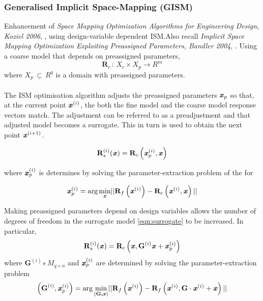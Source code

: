 

\subsubsection*{Generalised Implicit Space-Mapping (GISM)}
Enhancement of \textit{Space Mapping Optimization Algorithms for Engineering Design,
Koziel 2006}, \cite{SMOptAlgEngDesignKoziel}, using design-variable dependent ISM.Also recall \textit{Implicit Space Mapping Optimization Exploiting Preassigned Parameters, Bandler 2004}, \cite{ImplicitSMExploitParametersBandler}.
Using a coarse model that depends on preassigned parameters,
$$
\textbf{R}_c \, : \, X_c \times X_p \rightarrow R^m
$$
where $X_p \,\underline{\subset} \, R^q$ is a domain with preassigned parameters. \\
\\
The ISM optimisation algorithm adjusts the preassigned parameters $\textbf{\textit{x}}_p$ so that, at the current point $\textbf{\textit{x}}^{(i)}$, the both the fine model and the coarse model response vectors match. The adjustment can be referred to as a preadjustment  and that adjusted model becomes a surrogate. This in turn is used to obtain the next point $\textbf{\textit{x}}^{(i+1)}$. 

\begin{equation}
\textbf{R}_s^{(i)}(\textbf{\textit{x}}) = 
\textbf{R}_c \left( \textbf{\textit{x}}^{(i)}_p, \textbf{\textit{x}} \right)
\label{eqn:surrogate}
\end{equation}

where $\textbf{\textit{x}}^{(i)}_p$ is determines by solving the parameter-extraction problem of the for 

\begin{equation}
\textbf{\textit{x}}^{(i)}_p = 
\textup{arg} \, \underset{\textbf{\textit{x}}}{\textup{min}} 
\vert\vert
\textbf{R}_f \left( \textbf{\textit{x}}^{(i)} \right) - 
\textbf{R}_c \left(  \textbf{\textit{x}}^{(i)}, \textbf{\textit{x}} \right)
\vert\vert
\end{equation}

Making preassigned parameters depend on design variables allows the number of degrees of freedom in the surrogate model \ref{eqn:surrogate} to be increased. In particular,
\begin{equation}
\textbf{R}_s^{(i)}(\textbf{\textit{x}}) = 
\textbf{R}_c \left( \textbf{\textit{x}}, \textbf{G}^{(i)}\textbf{\textit{x}} + \textbf{\textit{x}}^{(i)}_p \right)
\end{equation}
where $ \textbf{G}^{(i)} \, \epsilon \, M_{q \times n} $ and $ \textbf{\textit{x}}^{(i)}_p $ are determined by solving the parameter-extraction problem 
\begin{equation}
\left( \textbf{G}^{(i)},\textbf{\textit{x}}^{(i)}_p \right) = 
\textup{arg} \, \underset{(\textbf{G,\textit{x}})}{\textup{min}} 
\vert\vert
\textbf{R}_f \left( \textbf{\textit{x}}^{(i)} \right) - 
\textbf{R}_f \left(  \textbf{\textit{x}}^{(i)}, \textbf{G} \cdot  \textbf{\textit{x}}^{(i)} + \textbf{\textit{x}} \right) 
\vert\vert
\end{equation}

